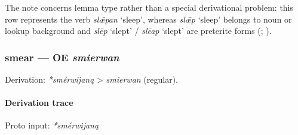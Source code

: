 \documentclass[
  british,
  a4paper,
]{article}
\begin{document}
The note concerns lemma type rather than a special derivational problem:
this row represents the verb \emph{slǣpan} `sleep', whereas \emph{slǣp}
`sleep' belongs to noun or lookup background and \emph{slēp} `slept' /
\emph{slēap} `slept' are preterite forms
(;
).

\subsubsection{\texorpdfstring{smear --- OE
\emph{smierwan}}{smear --- OE smierwan}}\label{smear-oe-smierwan}

Derivation: \emph{*smérwijaną} \textgreater{} \emph{smierwan} (regular).

\paragraph{Derivation trace}\label{derivation-trace-71}

Proto input: \emph{*smérwijaną}

\begingroup
\setlength{\fboxsep}{6pt}
\end{document}
